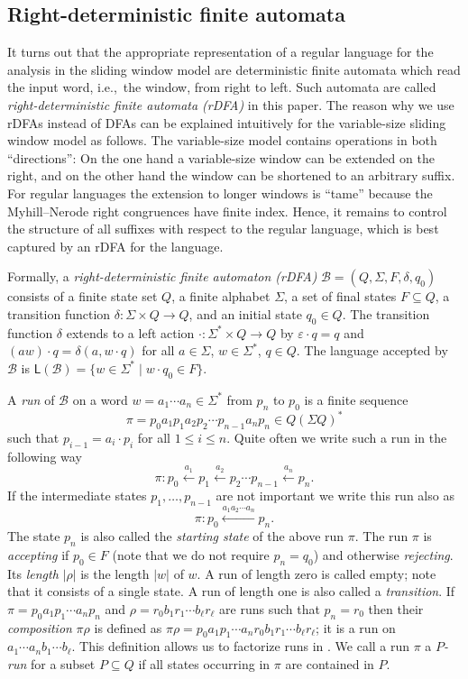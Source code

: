 \documentclass{theoretics}
\newcommand{\B}{\mathcal{B}}
\renewcommand{\L}{\mathsf{L}}
\newcommand{\eps}{\varepsilon}
\renewcommand{\leq}{\leqslant}
\renewcommand{\le}{\leq}
\begin{document}
\subsection{Right-deterministic finite automata}

It turns out that the appropriate representation of a regular language
for the analysis in the sliding window model are
deterministic finite automata which read the input word, i.e.,~the window, from right to left.
Such automata are called {\em right-deterministic finite automata (rDFA)} in this paper.
The reason why we use rDFAs instead of DFAs can be explained intuitively
for the variable-size sliding window model as follows.
The variable-size model contains operations in both ``directions'':
On the one hand a variable-size window can be extended on the right, and on the other hand the window can be shortened to an arbitrary suffix.
For regular languages the extension to longer windows is ``tame''
because the Myhill--Nerode right congruences have finite index.
Hence, it remains to control the structure of all suffixes with respect to the regular language,
which is best captured by an rDFA for the language.


Formally, a {\em right-deterministic finite automaton (rDFA)} $\B = (Q,\Sigma,F,\delta,q_0)$
consists of a finite state set $Q$, a finite alphabet $\Sigma$,
a set of final states $F \subseteq Q$, a transition function $\delta \colon \Sigma \times Q \to Q$,
and an initial state $q_0 \in Q$.
The transition function $\delta$ extends to a left action $\cdot \colon \Sigma^* \times Q \to Q$
by $\eps \cdot q = q$ and $(aw) \cdot q = \delta(a,w \cdot q)$ for all $a \in \Sigma$,
$w \in \Sigma^*$, $q \in Q$. The language accepted by $\B$ is
$\L(\B) = \{ w \in \Sigma^* \mid w \cdot q_0 \in F \}$.

A {\em run} of $\B$ on a word $w = a_1 \cdots a_n \in \Sigma^*$
from $p_n$ to $p_0$ is a finite sequence
\[ \pi = p_0 a_1 p_1 a_2 p_2 \cdots p_{n-1} a_n p_n \in Q (\Sigma Q)^* \]
such that $p_{i-1} = a_i \cdot p_i$ for all $1 \le i \le n$.
Quite often we write such a run in the following way
\[
\pi : p_0 \xleftarrow{a_1} p_1 \xleftarrow{a_2} p_2 \cdots p_{n-1} \xleftarrow{a_n} p_n .
\]
If the intermediate states $p_1,\ldots, p_{n-1}$ are not important we write this run also as
\[
\pi : p_0 \xleftarrow{a_1 a_2 \cdots a_n} p_n .
\]
The state $p_n$ is also called the \emph{starting state} of the above run $\pi$.
The run $\pi$ is {\em accepting} if $p_0 \in F$ (note that we do not require $p_n = q_0$) and otherwise {\em rejecting}.
Its {\em length} $|\rho|$ is the length $|w|$ of $w$. A run of length zero is called empty;
note that it consists of a single state. A run of length one is also called a {\em transition}.
If $\pi = p_0 a_1 p_1 \cdots a_n p_n$
and $\rho = r_0 b_1 r_1 \cdots b_\ell r_\ell $ are runs such that $p_n = r_0$
then their {\em composition} $\pi \rho$ is defined as
$\pi \rho = p_0 a_1 p_1 \cdots a_n r_0 b_1 r_1 \cdots b_\ell r_\ell$; it is a run on $a_1 \cdots a_n b_1 \cdots b_\ell$.
This definition allows
us to factorize runs in .
We call a run $\pi$ a {\em $P$-run} for a subset $P \subseteq Q$
if all states occurring in $\pi$ are contained in $P$.
\end{document}
